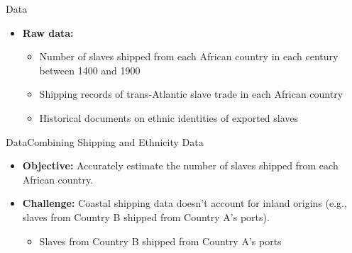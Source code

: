 \documentclass[hyperref={pdfpagelabels=false}]{beamer}
\begin{document}
\begin{frame}{Data}

\begin{itemize}
\item \textbf{Raw data:}
							\vspace{0.2cm}
\begin{itemize}
	\item Number of slaves shipped from each African country in each century between 1400 and 1900
							\vspace{0.2cm}
	\item Shipping records of trans-Atlantic slave trade in each African country 
							\vspace{0.2cm}
	\item Historical documents on ethnic identities of exported slaves
\end{itemize}
\end{itemize}
\end{frame}



\begin{frame}{Data}{Combining Shipping and Ethnicity Data}
\begin{itemize}
	\item \textbf{Objective:} Accurately estimate the number of slaves shipped from each African country.
								\vspace{0.2cm}
	\item \textbf{Challenge:} Coastal shipping data doesn't account for inland origins (e.g., slaves from Country B shipped from Country A's ports).
	\begin{itemize}
									\vspace{0.2cm}
		\item Slaves from Country B shipped from Country A's ports
	
	\end{itemize}
\end{itemize}
\end{frame}
\end{document}
